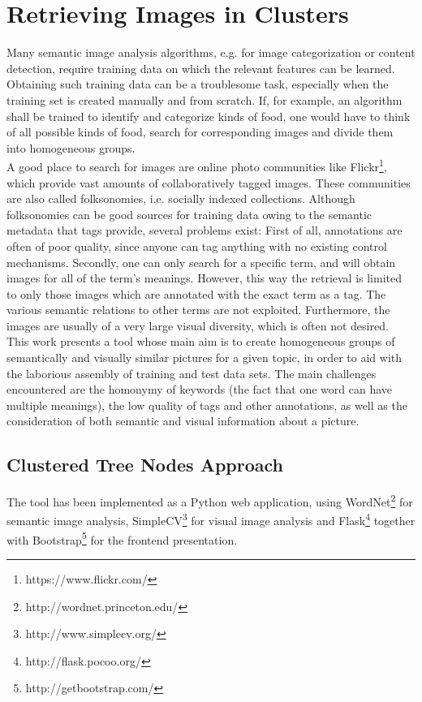 \section{Retrieving Images in Clusters}
\label{sec_introduction}

Many semantic image analysis algorithms, e.g. for image categorization or content detection, require training data on which the relevant features can be learned. Obtaining such training data can be a troublesome task, especially when the training set is created manually and from scratch. If, for example, an algorithm shall be trained to identify and categorize kinds of food, one would have to think of all possible kinds of food, search for corresponding images and divide them into homogeneous groups. \\
A good place to search for images are online photo communities like Flickr\footnote{https://www.flickr.com/}, which provide vast amounts of collaboratively tagged images. These communities are also called folksonomies, i.e. socially indexed collections.
Although folksonomies can be good sources for training data owing to the semantic metadata that tags provide, several problems exist: First of all, annotations are often of poor quality, since anyone can tag anything with no existing control mechanisms. Secondly, one can only search for a specific term, and will obtain images for all of the term's meanings. However, this way the retrieval is limited to only those images which are annotated with the exact term as a tag. The various semantic relations to other terms are not exploited. Furthermore, the images are usually of a very large visual diversity, which is often not desired. \\

This work presents a tool whose main aim is to create homogeneous groups of semantically and visually similar pictures for a given topic, in order to aid with the laborious assembly of training and test data sets. The main challenges encountered are the homonymy of keywords (the fact that one word can have multiple meanings), the low quality of tags and other annotations, as well as the consideration of both semantic and visual information about a picture.

\subsection{Clustered Tree Nodes Approach}
The tool has been implemented as a Python web application, using WordNet\footnote{http://wordnet.princeton.edu/} for semantic image analysis, SimpleCV\footnote{http://www.simplecv.org/} for visual image analysis and Flask\footnote{http://flask.pocoo.org/} together with Bootstrap\footnote{http://getbootstrap.com/} for the frontend presentation.

